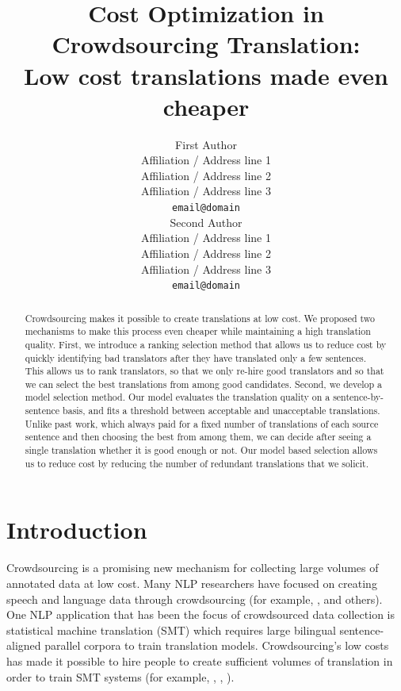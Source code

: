 \documentclass[11pt]{article}
\title{Cost Optimization in Crowdsourcing Translation:\\ Low cost translations made even cheaper}
\author{First Author \\
  Affiliation / Address line 1 \\
  Affiliation / Address line 2 \\
  Affiliation / Address line 3 \\
  {\tt email@domain} \\\And
  Second Author \\
  Affiliation / Address line 1 \\
  Affiliation / Address line 2 \\
  Affiliation / Address line 3 \\
  {\tt email@domain} \\}
\date{}
\begin{document}
\maketitle
\begin{abstract}
Crowdsourcing makes it possible to create translations at low cost. We proposed two mechanisms to make this process even cheaper while maintaining a high translation quality.
First, we introduce a ranking selection method that allows us to reduce cost by quickly identifying bad translators after they have translated only a few sentences.  This allows us to rank translators, so that we only re-hire good translators and so that we can select the best translations from among good candidates. Second, we develop a model selection method.  Our model evaluates the translation quality on a sentence-by-sentence basis, and fits a threshold between acceptable and unacceptable translations.   Unlike past work, which always paid for a fixed number of translations of each source sentence and then choosing the best from among them, we can decide after seeing a single translation whether it is good enough or not. Our model based selection allows us to reduce cost by reducing the number of redundant translations that we solicit.
 \end{abstract}

\section{Introduction}

Crowdsourcing is a promising new mechanism for collecting large volumes of annotated data at low cost.  %
Many NLP researchers have focused on creating speech and language data through crowdsourcing (for example,  ,  and others).  One NLP application that has been the focus of crowdsourced data collection is statistical machine translation (SMT) which requires large bilingual sentence-aligned parallel corpora to train translation models.  Crowdsourcing's low costs has made it possible to hire people to create sufficient volumes of translation in order to train SMT systems (for example,   ,  ,  ).
\end{document}
